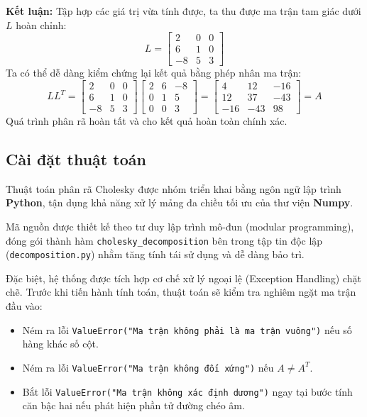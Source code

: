 \documentclass[a4paper,12pt]{report}
\begin{document}
\textbf{Kết luận:}
Tập hợp các giá trị vừa tính được, ta thu được ma trận tam giác dưới $L$ hoàn chỉnh:
\[
  L =
  \begin{bmatrix}
    2 & 0 & 0 \\
    6 & 1 & 0 \\
    -8 & 5 & 3
  \end{bmatrix}
\]
Ta có thể dễ dàng kiểm chứng lại kết quả bằng phép nhân ma trận:
\[
  L L^T =
  \begin{bmatrix}
    2 & 0 & 0 \\
    6 & 1 & 0 \\
    -8 & 5 & 3
  \end{bmatrix}
  \begin{bmatrix}
    2 & 6 & -8 \\
    0 & 1 & 5 \\
    0 & 0 & 3
  \end{bmatrix}
  =
  \begin{bmatrix}
    4 & 12 & -16 \\
    12 & 37 & -43 \\
    -16 & -43 & 98
  \end{bmatrix} = A
\]
Quá trình phân rã hoàn tất và cho kết quả hoàn toàn chính xác.

\subsection{Cài đặt thuật toán}
Thuật toán phân rã Cholesky được nhóm triển khai bằng ngôn ngữ lập trình \textbf{Python}, tận dụng khả năng xử lý mảng đa chiều tối ưu của thư viện \textbf{Numpy}.

Mã nguồn được thiết kế theo tư duy lập trình mô-đun (modular programming), đóng gói thành hàm \texttt{cholesky\_decomposition} bên trong tập tin độc lập (\texttt{decomposition.py}) nhằm tăng tính tái sử dụng và dễ dàng bảo trì.

Đặc biệt, hệ thống được tích hợp cơ chế xử lý ngoại lệ (Exception Handling) chặt chẽ. Trước khi tiến hành tính toán, thuật toán sẽ kiểm tra nghiêm ngặt ma trận đầu vào:
\begin{itemize}
  \item Ném ra lỗi \texttt{ValueError("Ma trận không phải là ma trận vuông")} nếu số hàng khác số cột.
  \item Ném ra lỗi \texttt{ValueError("Ma trận không đối xứng")} nếu $A \neq A^T$.
  \item Bắt lỗi \texttt{ValueError("Ma trận không xác định dương")} ngay tại bước tính căn bậc hai nếu phát hiện phần tử đường chéo âm.
\end{itemize}
\end{document}
